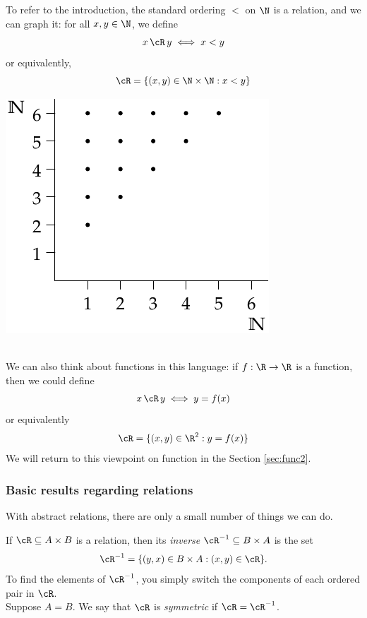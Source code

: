 \noindent\begin{minipage}{0.6\textwidth}
To refer to the introduction, the standard ordering $<$ on $\N$ is a relation, and we can graph it: for all $x,y\in\N$, we define
\[x\,\cR\,y\iff x<y\]
or equivalently,
\[\cR=\{(x,y)\in\N\times\N:x<y\}\]
\vspace*{10pt}
\end{minipage}\hfill\begin{minipage}{0.3\textwidth}
\includegraphics[width=\textwidth]{relations-25-less}
\end{minipage}\\
We can also think about functions in this language: if $f:\R\to\R$ is a function, then we could define
\[x\,\cR\,y\iff y=f(x)\]
or equivalently
\[\cR=\{(x,y)\in\R^2:y=f(x)\}\]
We will return to this viewpoint on function in the Section \ref{sec:func2}.

\subsubsection*{Basic results regarding relations}

With abstract relations, there are only a small number of things we can do.

\begin{defn}\label{defn:relnsym}
If $\cR\subseteq A\times B$ is a relation, then its \emph{inverse} $\cR^{-1}\subseteq B\times A$ is the set
\[\cR^{-1}=\{(y,x)\in B\times A:(x,y)\in\cR\}.\]
To find the elements of $\cR^{-1}$, you simply switch the components of each ordered pair in $\cR$.\\
Suppose $A=B$. We say that $\cR$ is \emph{symmetric} if $\cR=\cR^{-1}$.
\end{defn}\pagebreak[1]

